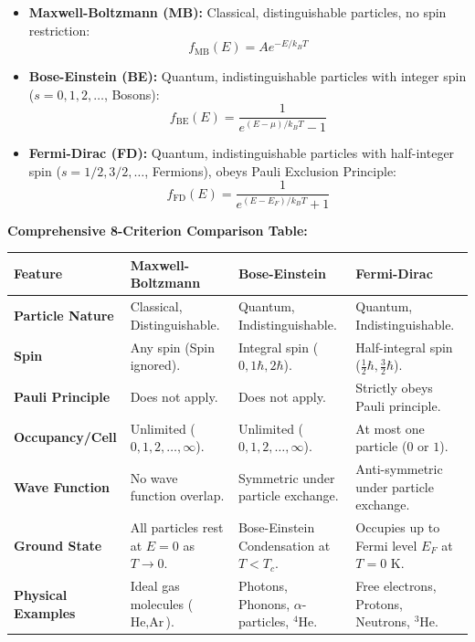 \documentclass[12pt,a4paper]{article}
\begin{document}
\begin{tcolorbox}[formulabox, title={\textbf{Three Distribution Functions}}]
\begin{itemize}[leftmargin=*, itemsep=3pt]
  \item \textbf{Maxwell-Boltzmann (MB):} Classical, distinguishable particles, no spin restriction:
  \begin{equation}
  f_{\text{MB}}(E) = A e^{-E / k_B T}
  \end{equation}
  \item \textbf{Bose-Einstein (BE):} Quantum, indistinguishable particles with integer spin ($s=0, 1, 2, \ldots$, Bosons):
  \begin{equation}
  f_{\text{BE}}(E) = \frac{1}{e^{(E-\mu)/k_B T} - 1}
  \end{equation}
  \item \textbf{Fermi-Dirac (FD):} Quantum, indistinguishable particles with half-integer spin ($s=1/2, 3/2, \ldots$, Fermions), obeys Pauli Exclusion Principle:
  \begin{equation}
  f_{\text{FD}}(E) = \frac{1}{e^{(E-E_F)/k_B T} + 1}
  \end{equation}
\end{itemize}
\end{tcolorbox}

\textbf{Comprehensive 8-Criterion Comparison Table:}\par\vspace{6pt}\noindent
\begin{tabularx}{\linewidth}{|B{2.8cm}|Y|Y|Y|}
\hline
\textbf{Feature} & \textbf{Maxwell-Boltzmann} & \textbf{Bose-Einstein} & \textbf{Fermi-Dirac} \\
\hline
\textbf{Particle Nature} & Classical, Distinguishable. & Quantum, Indistinguishable. & Quantum, Indistinguishable. \\
\hline
\textbf{Spin} & Any spin (Spin ignored). & Integral spin ($0, 1\hbar, 2\hbar$). & Half-integral spin ($\frac{1}{2}\hbar, \frac{3}{2}\hbar$). \\
\hline
\textbf{Pauli Principle} & Does not apply. & Does not apply. & Strictly obeys Pauli principle. \\
\hline
\textbf{Occupancy/Cell} & Unlimited ($0, 1, 2, \ldots, \infty$). & Unlimited ($0, 1, 2, \ldots, \infty$). & At most one particle ($0$ or $1$). \\
\hline
\textbf{Wave Function} & No wave function overlap. & Symmetric under particle exchange. & Anti-symmetric under particle exchange. \\
\hline
\textbf{Ground State} & All particles rest at $E=0$ as $T \to 0$. & Bose-Einstein Condensation at $T < T_c$. & Occupies up to Fermi level $E_F$ at $T=0\text{ K}$. \\
\hline
\textbf{Physical Examples} & Ideal gas molecules ($\text{He}, \text{Ar}$). & Photons, Phonons, $\alpha$-particles, $^4\text{He}$. & Free electrons, Protons, Neutrons, $^3\text{He}$. \\
\hline
\end{tabularx}
\end{document}
